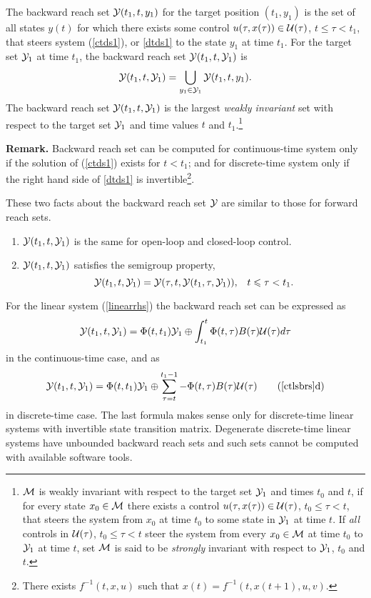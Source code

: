 The backward reach set $\YY(t_1, t, y_1)$ for the target position
$(t_1, y_1)$ is the set of all states $y(t)$ for which there exists
some control $u(\tau, x(\tau))\in\UU(\tau)$, $t\leq\tau<t_1$,
that steers system (\ref{ctds1}), or \ref{dtds1}
to the state $y_1$ at time $t_1$.
For the target set $\YY_1$ at time $t_1$, the backward reach set $\YY(t_1, t, \YY_1)$ is
\[ \YY(t_1, t, \YY_1) = \bigcup_{y_1\in\YY_1}\YY(t_1, t, y_1). \]
\label{def_olbrs}
\ed
The backward reach set $\YY(t_1, t, \YY_1)$ is the largest \emph{weakly invariant}
set with respect to the target set $\YY_1$ and time values $t$ and
$t_1$.\footnote{$\MM$ is weakly invariant with respect to
the target set $\YY_1$ and times $t_0$ and $t$, if for every state $x_0\in\MM$
there exists a control $u(\tau, x(\tau))\in\UU(\tau)$, $t_0\leq\tau< t$, that
steers the system from $x_0$ at time $t_0$ to some state in $\YY_1$ at time $t$.
If \emph{all} controls in $\UU(\tau)$, $t_0\leq\tau<t$ steer the system
from every $x_0\in\MM$ at time $t_0$ to $\YY_1$ at time $t$,
set $\MM$ is said to be
\emph{strongly} invariant with respect to $\YY_1$, $t_0$ and $t$.}

{\bf Remark.}
Backward reach set can be computed for continuous-time system only if
the solution of (\ref{ctds1}) exists for $t<t_1$; and for discrete-time
system only if the right hand side of \ref{dtds1}
is invertible\footnote{There exists $f^{-1}(t,x,u)$ such that
$x(t)=f^{-1}(t, x(t+1), u, v)$.}.

These two facts about
the backward reach set $\YY$ are similar to those for forward reach sets.
\begin{enumerate}
\item $\YY(t_1, t, \YY_1)$ is the same for open-loop
and closed-loop control.

\item $\YY(t_1, t, \YY_1)$ satisfies the semigroup property,
\begin{equation}
\YY(t_1, t, \YY_1) = \YY(\tau, t, \YY(t_1, \tau, \YY_1)), \;\;\;
t\leq \tau< t_1.
\label{semigroup_b}
\end{equation}
\end{enumerate}
For the linear system (\ref{linearrhs}) the backward reach set
can be expressed as
\begin{equation}
\YY(t_1, t, \YY_1) =
\Phi(t, t_1)\YY_1 \oplus \int_{t_1}^t\Phi(t, \tau)B(\tau)\UU(\tau)d\tau
\label{ctlsbrs}
\end{equation}
in the continuous-time case, and as
\begin{equation}
\YY(t_1, t, \YY_1) =
\Phi(t, t_1)\YY_1 \oplus \sum_{\tau =t}^{t_1-1}-\Phi(t, \tau)B(\tau)\UU(\tau)
\tag*{(\ref{ctlsbrs}d)}
\label{dtlsbrs}
\end{equation}
in discrete-time case.
The last formula makes sense only for discrete-time linear systems with
invertible state transition matrix.
Degenerate discrete-time linear systems have unbounded backward reach sets and such sets
cannot be computed with available software tools.

